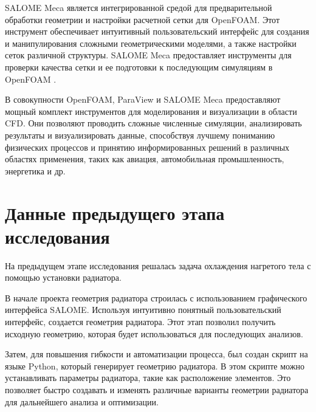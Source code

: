 \documentclass[a4paper,12pt]{article}
\theoremstyle{plain} %
\theoremstyle{definition} %
\theoremstyle{remark} %
\begin{document}
SALOME Meca является интегрированной средой для предварительной обработки геометрии и настройки расчетной сетки для OpenFOAM. Этот инструмент обеспечивает интуитивный пользовательский интерфейс для создания и манипулирования сложными геометрическими моделями, а также настройки сеток различной структуры. SALOME Meca предоставляет инструменты для проверки качества сетки и ее подготовки к последующим симуляциям в OpenFOAM \cite{wOfDocSalome}.

В совокупности OpenFOAM, ParaView и SALOME Meca предоставляют мощный комплект инструментов для моделирования и визуализации в области CFD. Они позволяют проводить сложные численные симуляции, анализировать результаты и визуализировать данные, способствуя лучшему пониманию физических процессов и принятию информированных решений в различных областях применения, таких как авиация, автомобильная промышленность, энергетика и др.

\newpage
\section{Данные предыдущего этапа исследования}

На предыдущем этапе исследования решалась задача охлаждения нагретого тела с помощью установки радиатора.

В начале проекта геометрия радиатора строилась с использованием графического интерфейса SALOME. Используя интуитивно понятный пользовательский интерфейс, создается геометрия радиатора. Этот этап позволил получить исходную геометрию, которая будет использоваться для последующих анализов.

Затем, для повышения гибкости и автоматизации процесса, был создан скрипт на языке Python, который генерирует геометрию радиатора. В этом скрипте можно устанавливать параметры радиатора, такие как расположение элементов. Это позволяет быстро создавать и изменять различные варианты геометрии радиатора для дальнейшего анализа и оптимизации.
\end{document}
